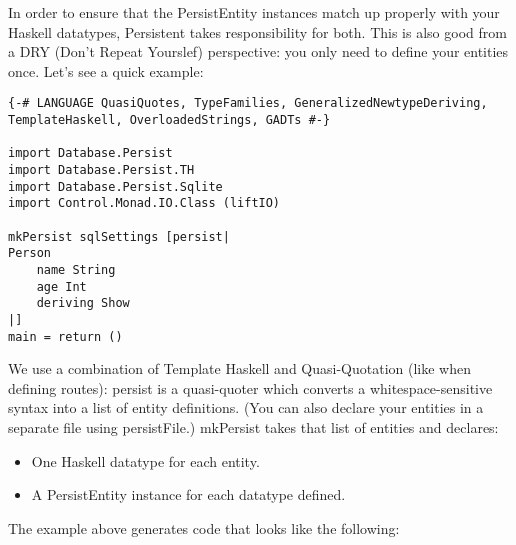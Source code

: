 In order to ensure that the PersistEntity instances match up properly with your Haskell datatypes, Persistent takes responsibility for both. This is also good from a DRY (Don't Repeat Yourslef) perspective: you only need to define your entities once. Let's see a quick example:

\begin{lstlisting}
{-# LANGUAGE QuasiQuotes, TypeFamilies, GeneralizedNewtypeDeriving, TemplateHaskell, OverloadedStrings, GADTs #-}

import Database.Persist
import Database.Persist.TH
import Database.Persist.Sqlite
import Control.Monad.IO.Class (liftIO)

mkPersist sqlSettings [persist|
Person
    name String
    age Int
    deriving Show
|]
main = return ()
\end{lstlisting}

We use a combination of Template Haskell and Quasi-Quotation (like when defining routes): persist is a quasi-quoter which converts a whitespace-sensitive syntax into a list of entity definitions. (You can also declare your entities in a separate file using persistFile.) mkPersist takes that list of entities and declares:

\begin{itemize}
  \item One Haskell datatype for each entity.
  \item A PersistEntity instance for each datatype defined.
\end{itemize}

The example above generates code that looks like the following:

